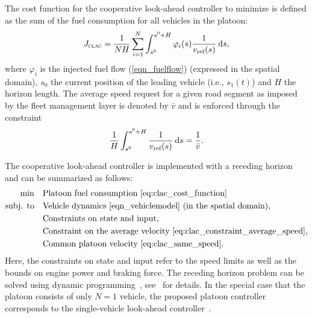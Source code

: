 \documentclass[journal]{IEEEtran}
\newcommand{\vref}{\ensuremath{v_{\text{\rm ref}}}}
\begin{document}
The cost function for the cooperative look-ahead controller to minimize is defined as the sum of the fuel consumption for all vehicles in the platoon:
\begin{equation}
J_{\textsc{clac}} = \frac{1}{NH} \sum_{i=1}^N \int_{s^0}^{s^0 + H} \varphi_i(s) \frac{1}{\vref(s)} \di s,
\label{eq:clac_cost_function}
\end{equation}
where $\varphi_i$ is the injected fuel flow (\ref{eqn_fuelflow}) (expressed in the spatial domain), $s_0$ the current position of the leading vehicle (i.e., $s_1(t)$) and $H$ the horizon length. The average speed request for a given road segment as imposed by the fleet management layer is denoted by $\bar{v}$ and is enforced through the constraint
\begin{equation}
\frac{1}{H}\int_{s^0}^{s^0+H} \frac{1}{v_\text{ref}(s)} \:\mathrm{d} s = \frac{1}{\bar{v}}.
\label{eq:clac_constraint_average_speed}
\end{equation}

The cooperative look-ahead controller is implemented with a receding horizon and can be summarized as follows:
\begin{equation}
\begin{aligned}
\min \quad & \text{Platoon fuel consumption \eqref{eq:clac_cost_function}} \\
\text{subj. to} \quad
& \text{Vehicle dynamics \eqref{eqn_vehiclemodel} (in the spatial domain),} \\
& \text{Constraints on state and input,} \\
& \text{Constraint on the average velocity \eqref{eq:clac_constraint_average_speed},} \\
& \text{Common platoon velocity \eqref{eq:clac_same_speed}}.
\end{aligned}
\nonumber
\end{equation}
Here, the constraints on state and input refer to the speed limits as well as the bounds on engine power and braking force. The receding horizon problem can be solved using dynamic programming~\cite{book_bellman_1957}, see~\cite{turri_2015} for details. In the special case that the platoon consists of only $N=1$ vehicle, the proposed platoon controller corresponds to the single-vehicle look-ahead controller~\cite{hellstrom_2009}.
\end{document}
